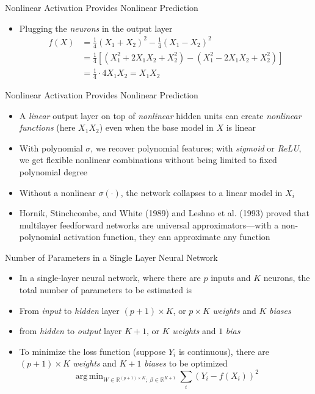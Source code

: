 \documentclass[aspectratio=1610,12pt,xcolor=dvipsnames]{beamer}
\DeclareMathOperator*{\argmin}{arg\,min}
\begin{document}
\begin{frame}{Nonlinear Activation Provides Nonlinear Prediction}
\begin{itemize}
    \item Plugging the \textit{neurons} in the output layer 
    \begin{align*}
            f(X) &= \frac{1}{4}\left(X_1+X_2\right)^2 - \frac{1}{4}\left(X_1-X_2\right)^2 \\
    &= \frac{1}{4}\left[\left(X_1^2+2X_1X_2+X_2^2\right) - \left(X_1^2-2X_1X_2+X_2^2\right)\right] \\
    &= \frac{1}{4} \cdot 4X_1X_2 = X_1X_2
    \end{align*}
\end{itemize}
\end{frame}

\begin{frame}{Nonlinear Activation Provides Nonlinear Prediction}
    \begin{itemize}
        \item A \textit{linear} output layer on top of \textit{nonlinear} hidden units can create \textit{nonlinear functions} (here \(X_1X_2\)) even when the base model in \(X\) is linear
        \item With polynomial \(\sigma\), we recover polynomial features; with \textit{sigmoid} or \textit{ReLU}, we get flexible nonlinear combinations without being limited to fixed polynomial degree
        \item Without a nonlinear \(\sigma(\cdot)\), the network collapses to a linear model in \(X_i\) \pause
         \item Hornik, Stinchcombe, and White (1989) and Leshno et al. (1993) proved that multilayer feedforward networks are universal approximators—with a non-polynomial activation function, they can approximate any function
    \end{itemize}
\end{frame}

\begin{frame}{Number of Parameters in a Single Layer Neural Network}

\begin{itemize}
    \item In a single-layer neural network, where there are $p$ inputs and $K$ neurons, the total number of parameters to be estimated is 
    \item From \textit{input} to \textit{hidden} layer $(p+1) \times K$, or $p\times K$ \textit{weights} and $K$ \textit{biases}
    \item from \textit{hidden} to \textit{output} layer $K+1$, or $K$ \textit{weights} and $1$ \textit{bias}
    \item To minimize the loss function (suppose $Y_i$ is continuous), there are $(p+1)\times K$ \textit{weights} and $K+1$ \textit{biases} to be optimized
    \[
    \argmin_{W\in \mathbb{R}^{(p+1)\times K}; \: \beta \in \mathbb{R}^{K+1}} \sum_i \left( Y_i - f(X_i)\right)^2
    \]
\end{itemize}
\end{frame}
\end{document}
